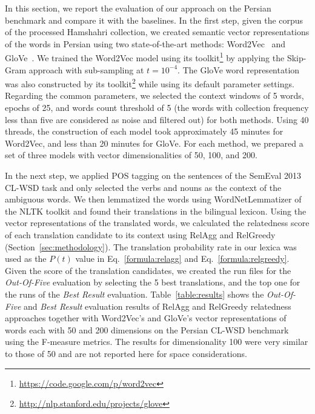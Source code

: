 In this section, we report the evaluation of our approach on the Persian benchmark and compare it with the baselines. In the first step, given the corpus of the processed Hamshahri collection, we created semantic vector representations of the words in Persian using two state-of-the-art methods: Word2Vec~\cite{mikolov2013efficient} and GloVe~\cite{pennington2014glove}. We trained the Word2Vec model using its toolkit\footnote{\url{https://code.google.com/p/word2vec}} by applying the Skip-Gram approach with sub-sampling at $t=10^{-4}$. The GloVe word representation was also constructed by its toolkit\footnote{\url{http://nlp.stanford.edu/projects/glove}} while using its default parameter settings. Regarding the common parameters, we selected the context windows of 5 words, epochs of 25, and words count threshold of 5 (the words with collection frequency less than five are considered as noise and filtered out) for both methods. Using 40 threads, the construction of each model took approximately 45 minutes for Word2Vec, and less than 20 minutes for GloVe. For each method, we prepared a set of three models with vector dimensionalities of 50, 100, and 200.

In the next step, we applied POS tagging on the sentences of the SemEval 2013 CL-WSD task and only selected the verbs and nouns as the context of the ambiguous words. We then lemmatized the words using WordNetLemmatizer of the NLTK toolkit and found their translations in the  bilingual lexicon. Using the vector representations of the translated words, we calculated the relatedness score of each translation candidate to its context using RelAgg and RelGreedy (Section~\ref{sec:methodology}). The translation probability rate in our lexica was used as the $P(t)$ value in Eq.~\ref{formula:relagg} and Eq.~\ref{formula:relgreedy}. Given the score of the translation candidates, we created the run files for the \emph{Out-Of-Five} evaluation by selecting the 5 best translations, and the top one for the runs of the \emph{Best Result} evaluation. Table~\ref{table:results} shows the \emph{Out-Of-Five} and \emph{Best Result} evaluation results of RelAgg and RelGreedy relatedness approaches together with Word2Vec's and GloVe's vector representations of words each with 50 and 200 dimensions on the Persian CL-WSD benchmark using the F-measure metrics. The results for dimensionality 100 were very similar to those of 50 and are not reported here for space considerations.%

